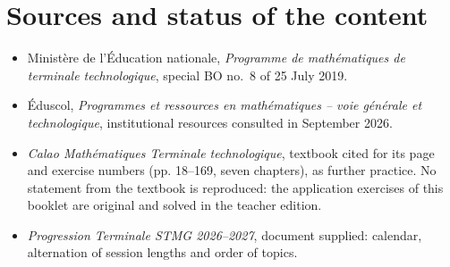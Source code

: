 \chapter{Sources and status of the content}
\begin{itemize}
\item Ministère de l'Éducation nationale, \emph{Programme de mathématiques de terminale technologique}, special BO no.~8 of 25 July 2019.
\item Éduscol, \emph{Programmes et ressources en mathématiques -- voie générale et technologique}, institutional resources consulted in September 2026.
\item \emph{Calao Mathématiques Terminale technologique}, textbook cited for its page and exercise numbers (pp. 18--169, seven chapters), as further practice. No statement from the textbook is reproduced: the application exercises of this booklet are original and solved in the teacher edition.
\item \emph{Progression Terminale STMG 2026--2027}, document supplied: calendar, alternation of session lengths and order of topics.
\end{itemize}
